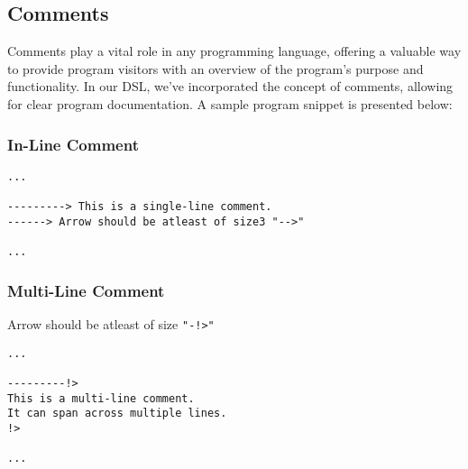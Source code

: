 \documentclass{article}
\begin{document}
\subsection{Comments}
Comments play a vital role in any programming language, offering a valuable way to provide program visitors with an overview of the program's purpose and functionality. In our DSL, we've incorporated the concept of comments, allowing for clear program documentation. A sample program snippet is presented below:

\subsubsection{In-Line Comment}
\begin{verbatim}
...

---------> This is a single-line comment.
------> Arrow should be atleast of size3 "-->"

...
\end{verbatim}

\subsubsection{Multi-Line Comment}
Arrow should be atleast of size \texttt{"-!>"}
\begin{verbatim}
...

---------!>
This is a multi-line comment.
It can span across multiple lines.
!>

...
\end{verbatim}
\end{document}
